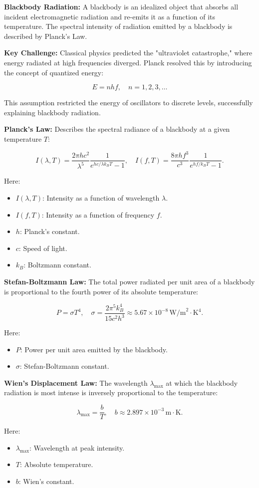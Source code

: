 \documentclass{article}
\newcommand{\eqbox}[1]{\begin{tcolorbox}[colback=gray!10] #1 \end{tcolorbox}}
\newcommand{\conceptbox}[1]{\begin{tcolorbox}[colback=blue!10] #1 \end{tcolorbox}}
\begin{document}
\conceptbox{
\textbf{Blackbody Radiation:}
A blackbody is an idealized object that absorbs all incident electromagnetic radiation and re-emits it as a function of its temperature. The spectral intensity of radiation emitted by a blackbody is described by Planck's Law.
}

\conceptbox{
\textbf{Key Challenge:}
Classical physics predicted the "ultraviolet catastrophe," where energy radiated at high frequencies diverged. Planck resolved this by introducing the concept of quantized energy:
\eqbox{
\[
E = nhf, \quad n = 1, 2, 3, \dots
\]
}
This assumption restricted the energy of oscillators to discrete levels, successfully explaining blackbody radiation.
}

\conceptbox{
\textbf{Planck's Law:}
Describes the spectral radiance of a blackbody at a given temperature \( T \):
\eqbox{
\[
I(\lambda, T) = \frac{2\pi hc^2}{\lambda^5}\frac{1}{e^{hc/\lambda k_BT} - 1}, \quad I(f, T) = \frac{8 \pi h f^3}{c^3}\frac{1}{e^{hf/k_BT} - 1}.
\]
}
Here:
\begin{itemize}
    \item \( I(\lambda, T) \): Intensity as a function of wavelength \( \lambda \).
    \item \( I(f, T) \): Intensity as a function of frequency \( f \).
    \item \( h \): Planck's constant.
    \item \( c \): Speed of light.
    \item \( k_B \): Boltzmann constant.
\end{itemize}
}

\conceptbox{
\textbf{Stefan-Boltzmann Law:}
The total power radiated per unit area of a blackbody is proportional to the fourth power of its absolute temperature:
\eqbox{
\[
P = \sigma T^4, \quad \sigma = \frac{2\pi^5 k_B^4}{15c^2h^3} \approx 5.67 \times 10^{-8} \, \text{W/m}^2\cdot \text{K}^4.
\]
}
Here:
\begin{itemize}
    \item \( P \): Power per unit area emitted by the blackbody.
    \item \( \sigma \): Stefan-Boltzmann constant.
\end{itemize}
}

\conceptbox{
\textbf{Wien's Displacement Law:}
The wavelength \( \lambda_{\text{max}} \) at which the blackbody radiation is most intense is inversely proportional to the temperature:
\eqbox{
\[
\lambda_{\text{max}} = \frac{b}{T}, \quad b \approx 2.897 \times 10^{-3} \, \text{m} \cdot \text{K}.
\]
}
Here:
\begin{itemize}
    \item \( \lambda_{\text{max}} \): Wavelength at peak intensity.
    \item \( T \): Absolute temperature.
    \item \( b \): Wien's constant.
\end{itemize}
}
\end{document}
